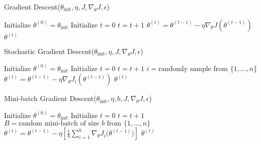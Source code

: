\documentclass{article}
\begin{document}
\begin{algorithm}
\caption{Gradient Descent($\theta_{\text{init}}, \eta, J, \nabla_\theta J, \epsilon$)}
\label{alg:gradient-descent}
\begin{algorithmic}[1]
\STATE Initialize $\theta^{(0)} = \theta_{\text{init}}$
\STATE Initialize $t = 0$
\REPEAT
  \STATE $t = t + 1$
  \STATE $\theta^{(t)} = \theta^{(t-1)} - \eta \nabla_\theta J(\theta^{(t-1)})$
\RETURN $\theta^{(t)}$
\end{algorithmic}
\end{algorithm}

\begin{algorithm}
\caption{Stochastic Gradient Descent($\theta_{\text{init}}, \eta, J, \nabla_\theta J, \epsilon$)}
\label{alg:stochastic-gradient-descent}
\begin{algorithmic}[1]
\STATE Initialize $\theta^{(0)} = \theta_{\text{init}}$
\STATE Initialize $t = 0$
\REPEAT
  \STATE $t = t + 1$
  \STATE $i = \text{randomly sample from } \{1, \ldots, n\}$
  \STATE $\theta^{(t)} = \theta^{(t-1)} - \eta \nabla_\theta J_i(\theta^{(t-1)})$
\RETURN $\theta^{(t)}$
\end{algorithmic}
\end{algorithm}

\begin{algorithm}
\caption{Mini-batch Gradient Descent($\theta_{\text{init}}, \eta, b, J, \nabla_\theta J, \epsilon$)}
\label{alg:mini-batch-gradient-descent}
\begin{algorithmic}[1]
\STATE Initialize $\theta^{(0)} = \theta_{\text{init}}$
\STATE Initialize $t = 0$
\REPEAT
  \STATE $t = t + 1$
  \STATE $B = \text{random mini-batch of size } b \text{ from } \{1, \ldots, n\}$
  \STATE $\theta^{(t)} = \theta^{(t-1)} - \eta \left[\frac{1}{b} \sum_{i=1}^b \nabla_\theta J_i\big(\theta^{(t-1)}\big)\right]$
\RETURN $\theta^{(t)}$
\end{algorithmic}
\end{algorithm}
\end{document}
